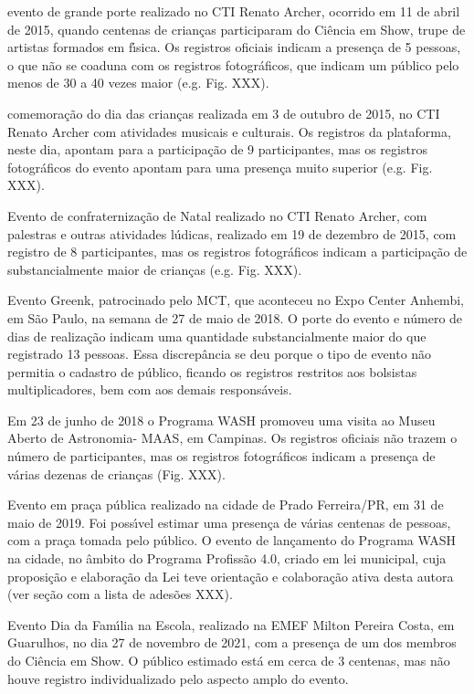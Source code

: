 \documentclass[
12pt,		%
openright,	%
twoside,  %
a4paper,			%
chapter=TITLE,		%
english,			%
french,				%
spanish,			%
brazil				%
]{USPSC-classe/USPSC}
\begin{document}
\begin{alineas}
\item evento de grande porte realizado no CTI Renato Archer, ocorrido em 11 de abril de 2015, quando centenas de crian\c{c}as participaram do Ci\^encia em Show, trupe de artistas formados em f\'{\i}sica. Os registros oficiais indicam a presen\c{c}a de 5 pessoas, o que n\~ao se coaduna com os registros fotogr\'aficos, que indicam um p\'ublico pelo menos de 30 a 40 vezes maior (e.g. Fig. XXX).
\item comemora\c{c}\~ao do dia das crian\c{c}as realizada em 3 de outubro de 2015, no CTI Renato Archer com atividades musicais e culturais. Os registros da plataforma, neste dia, apontam para a participa\c{c}\~ao de 9 participantes, mas os registros fotogr\'aficos do evento apontam para uma presen\c{c}a muito superior (e.g. Fig. XXX).
\item Evento de confraterniza\c{c}\~ao de Natal realizado no CTI Renato Archer, com palestras e outras atividades l\'udicas, realizado em 19 de dezembro de 2015, com registro de 8 participantes, mas os registros fotogr\'aficos indicam a participa\c{c}\~ao de substancialmente maior de crian\c{c}as (e.g. Fig. XXX).
\item Evento Greenk, patrocinado pelo MCT, que aconteceu no Expo Center Anhembi, em S\~ao Paulo, na semana de 27 de maio de 2018. O porte do evento e n\'umero de dias de realiza\c{c}\~ao indicam uma quantidade substancialmente maior do que registrado 13 pessoas. Essa discrep\^ancia se deu porque o tipo de evento n\~ao permitia o cadastro de p\'ublico, ficando os registros restritos aos bolsistas multiplicadores, bem com aos demais respons\'aveis.
\item Em 23 de junho de 2018 o Programa WASH promoveu uma visita ao Museu Aberto de Astronomia- MAAS, em Campinas. Os registros oficiais n\~ao trazem o n\'umero de participantes, mas os registros fotogr\'aficos indicam a presen\c{c}a de v\'arias dezenas de crian\c{c}as (Fig. XXX).
\item Evento em pra\c{c}a p\'ublica realizado na cidade de Prado Ferreira/PR, em 31 de maio de 2019. Foi poss\'{\i}vel estimar uma presen\c{c}a de v\'arias centenas de pessoas, com a pra\c{c}a tomada pelo p\'ublico. O evento de  lan\c{c}amento do Programa WASH na cidade, no \^ambito do Programa Profiss\~ao 4.0, criado em lei municipal, cuja proposi\c{c}\~ao e elabora\c{c}\~ao da Lei teve orienta\c{c}\~ao e colabora\c{c}\~ao ativa desta autora (ver se\c{c}\~ao com a lista de ades\~oes XXX).
\item Evento Dia da Fam\'{\i}lia na Escola, realizado na EMEF Milton Pereira Costa, em Guarulhos, no dia 27 de novembro de 2021, com a presen\c{c}a de um dos membros do Ci\^encia em Show. O p\'ublico estimado est\'a em cerca de 3 centenas, mas n\~ao houve registro individualizado pelo aspecto amplo do evento.
\end{alineas}
\end{document}
